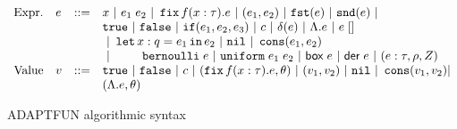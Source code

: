 \begin{figure}
    \centering
    \[\begin{array}{llll}
\mbox{Expr.} & \expr & ::= & x ~|~ \expr_1 \eapp \expr_2 ~|~ \efix f(x:\type).\expr
 ~|~ (\expr_1, \expr_2) ~|~ \eprojl(\expr) ~|~ \eprojr(\expr) ~| \\
%
& & & \etrue ~|~ \efalse ~|~ \eif(\expr_1, \expr_2, \expr_3) ~|~
\econst ~|~ \eop(\expr)  ~|~  \eilam \expr ~|~ \expr \eapp []  \\
& & & ~|~  \elet  x:q = \expr_1 \ein \expr_2  ~|~ \enil ~|~  \econs (
      \expr_1, \expr_2) \\
& & & ~|~  ~~~~~~~
 \bernoulli \eapp \expr ~|~ \uniform \eapp \expr_1 \eapp
      \expr_2 ~|~ \cbox \eapp \expr ~|~ \cder \eapp \expr ~|~ (\expr: \type, \dmap, \nnatA) \\
%
\mbox{Value} & \valr & ::= & \etrue ~|~ \efalse ~|~ \econst ~|~
(\efix f(x:\type).\expr, \env) ~|~ (\valr_1, \valr_2) 
    ~|~ \enil ~|~ \econs (\valr_1, \valr_2) | \\
& & & (\eilam \expr , \env)  
\end{array}\]
    \caption{ADAPTFUN algorithmic syntax}
    \label{fig:core-syntax}
\end{figure}


